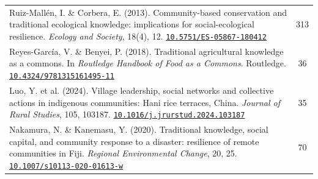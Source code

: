 \documentclass[a4paper,11pt]{article}
\newcommand{\doi}[1]{\href{https://doi.org/#1}{\texttt{#1}}}
\begin{document}
\begin{longtable}{>{\raggedright\arraybackslash}p{} c}
Ruiz-Mallén, I. \& Corbera, E. (2013). Community-based conservation and traditional ecological knowledge: implications for social-ecological resilience. \textit{Ecology and Society}, 18(4), 12.\newline
\doi{10.5751/ES-05867-180412} & 313 \\
\addlinespace

Reyes-García, V. \& Benyei, P. (2018). Traditional agricultural knowledge as a commons. In \textit{Routledge Handbook of Food as a Commons}. Routledge.\newline
\doi{10.4324/9781315161495-11} & 36 \\
\addlinespace

Luo, Y. et al. (2024). Village leadership, social networks and collective actions in indigenous communities: Hani rice terraces, China. \textit{Journal of Rural Studies}, 105, 103187.\newline
\doi{10.1016/j.jrurstud.2024.103187} & 35 \\
\addlinespace

Nakamura, N. \& Kanemasu, Y. (2020). Traditional knowledge, social capital, and community response to a disaster: resilience of remote communities in Fiji. \textit{Regional Environmental Change}, 20, 25.\newline
\doi{10.1007/s10113-020-01613-w} & 70 \\

\bottomrule
\end{longtable}
\end{document}
